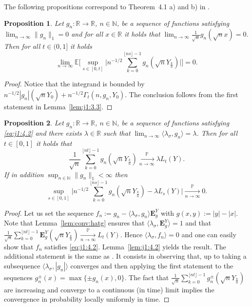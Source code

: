 \documentclass[12pt]{article}
\numberwithin{equation}{section}
\newtheorem{proposition}{Proposition}
\theoremstyle{definition}
\theoremstyle{remark}
\newcommand{\convp}[1][]{\xrightarrow[#1]{\PP}}
\newcommand{\NN}{\mathbb{N}}
\newcommand{\RR}{\mathbb{R}}
\newcommand{\PP}{\mathbb{P}}
\newcommand{\EE}{\mathbb{E}}
\newcommand{\bfH}[1]{\mathbf{E}^Y_{#1}}
\begin{document}
The following propositions correspond to Theorem~4.1 a) and b) in \cite{j1}. 
\begin{proposition} \label{prop:th4.1a:j1}
Let $g_n \colon \RR \to \RR$, $n\in \NN$, be a sequence of functions satisfying
$\lim_{n\to\infty} \|g_n\|_{1} =0$ 
and for all $x\in \RR$ it holds that
$\lim_{n\to\infty} \frac{1}{\sqrt{n}} g_n(\sqrt{n} x) =0$.
Then for all $t\in (0,1]$ it holds
\begin{equation}\lim_{n\to\infty} \EE\Big[ \sup_{s\in [0,t]} \big|n^{-1/2}  \sum_{k=0}^{\lfloor n s \rfloor-1} g_n(\sqrt{n} Y_{\frac{k}n}) \big|\Big]=0.
\end{equation}
\end{proposition}
%
\begin{proof}
Notice that the integrand is bounded by $n^{-1/2}|g_n|(\sqrt{n}Y_0) + n^{-1/2} \Gamma_t(n,g_n,Y_0)$. The conclusion follows from the first statement in Lemma~\ref{lem:j1:3.3}. 
\end{proof}

\begin{proposition} \label{prop:th4.1b:j1}
Let $g_n \colon \RR \to \RR$, $n\in \NN$, be a sequence of functions satisfying \eqref{eq:j1:4.2}
and there exists $\lambda\in \RR$ such that $\lim_{n\to\infty} \langle \lambda_\sigma , g_n \rangle=\lambda$.
Then for all $t\in [0,1]$ it holds that 
\begin{equation}
	\frac1{\sqrt{n}}  \sum_{k=0}^{\lfloor n t \rfloor-1} g_n(\sqrt{n} Y_{\frac{k}n})  \convp[n\to\infty] \lambda L_t(Y).
\end{equation}
If in addition $\sup_{n\in \NN} \|g_n\|_{1} <\infty$ 
then 
\begin{equation}
	\sup_{s\in [0,1]} \Big| n^{-1/2}  \sum_{k=0}^{\lfloor n s \rfloor-1} g_n(\sqrt{n} Y_{\frac{k}n}) - \lambda L_s(Y)\Big|\convp[n\to\infty] 0.
\end{equation}
\end{proposition}
%
%
%
\begin{proof}
Let us set the sequence $f_n:=g_n - \langle \lambda_\sigma , g_n \rangle \bfH{g}$ with 
$g (x,y) := |y| - |x|$.
Note that Lemma~\ref{lem:conv:hatg} ensures that 
$\langle \lambda_\sigma , \bfH{g} \rangle=1$ and that $\frac{1}{\sqrt n}  \sum_{k=0}^{\lfloor n t \rfloor-1} \bfH{g}(\sqrt{n} Y_{\frac{k}n})  \convp[n\to\infty] L_t(Y)$.
Hence $\langle \lambda_\sigma , f_n \rangle=0$ and one can easily show that $f_n$ satisfies \eqref{eq:j1:4.2}.
Lemma~\ref{lem:j1:4.2} yields the result.
The additional statement is the same as \cite[Theorem~4.1]{j1}. It consists in observing that, up to taking a subsequence 
$\langle \lambda_\sigma , |g_{n}| \rangle$ converges and then applying the first statement to the sequences $g_{n}^\pm(x)=\max\{\pm g_{n}(x),0\}$. The fact that $\frac1{\sqrt{n}}  \sum_{k=0}^{\lfloor n t \rfloor-1} g_n^\pm(\sqrt{n} Y_{\frac{k}n}) $ are increasing and converge to a continuous (in time) limit implies the convergence in probability locally uniformly in time.
\end{proof}
\end{document}
